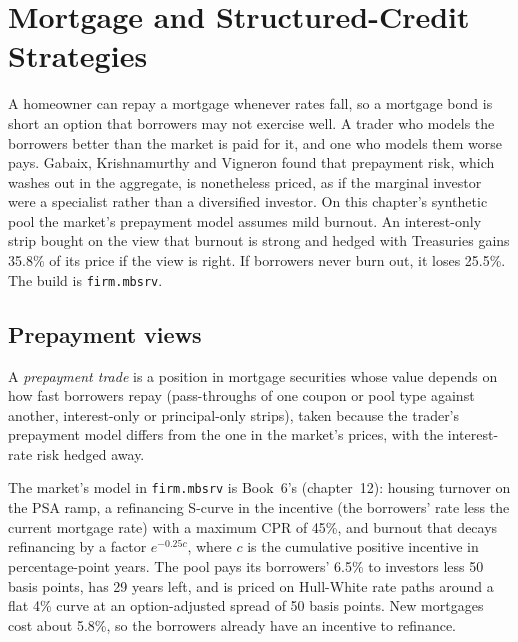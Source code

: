 \chapter{Mortgage and Structured-Credit Strategies}\label{ch:s2:mortgage-and-structured-credit-strategies}

A homeowner can repay a mortgage whenever rates fall, so a mortgage bond is short an option that borrowers may not exercise well. A trader who models
the borrowers better than the market is paid for it, and one who models them worse pays. Gabaix, Krishnamurthy and Vigneron found that prepayment risk,
which washes out in the aggregate, is nonetheless priced, as if the marginal investor were a specialist rather than a diversified investor. On this
chapter's synthetic pool the market's prepayment model assumes mild burnout. An interest-only strip bought on the view that burnout is strong and
hedged with Treasuries gains 35.8\% of its price if the view is right. If borrowers never burn out, it loses 25.5\%. The build is
\texttt{firm.mbsrv}.

\section{Prepayment views}

\begin{definition}\label{def:s2:mortgage-and-structured-credit-strategies:prepaytrade}
A \emph{prepayment trade} is a position in mortgage securities whose value depends on how fast borrowers repay (pass-throughs
of one coupon or pool type against another, interest-only or principal-only strips), taken because the trader's prepayment model differs from the one
in the market's prices, with the interest-rate risk hedged away.
\end{definition}

The market's model in \texttt{firm.mbsrv} is Book~6's (chapter~12): housing turnover on the PSA ramp, a refinancing S-curve in the incentive (the
borrowers' rate less the current mortgage rate) with a maximum CPR of 45\%, and burnout that decays refinancing by a factor $e^{-0.25 c}$, where $c$
is the cumulative positive incentive in percentage-point years. The pool pays its borrowers' 6.5\% to investors less 50 basis points, has 29 years
left, and is priced on Hull-White rate paths around a flat 4\% curve at an option-adjusted spread of 50 basis points. New mortgages cost about 5.8\%,
so the borrowers already have an incentive to refinance.

